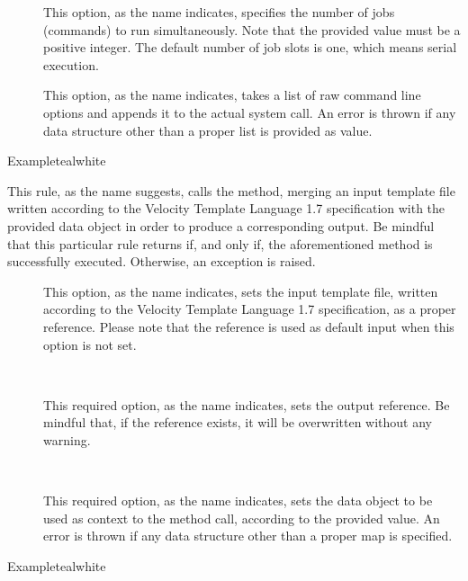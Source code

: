 \begin{description}
\begin{description}
\item[] This option, as the name indicates, specifies the number of jobs (commands) to run simultaneously. Note that the provided value must be a positive integer. The default number of job slots is one, which means serial execution.

\item[] This option, as the name indicates, takes a list of raw command line options and appends it to the actual system call. An error is thrown if any data structure other than a proper list is provided as value.
\end{description}

\begin{codebox}{Example}{teal}{\icnote}{white}
\end{codebox}

\item[\rulebox{velocity}{Paulo Cereda}] This rule, as the name suggests, calls the  method, merging an input template file written according to the Velocity Template Language 1.7 specification with the provided  data object in order to produce a corresponding  output. Be mindful that this particular rule returns  if, and only if, the aforementioned method is successfully executed. Otherwise, an exception is raised.

\begin{description}
\item[] This option, as the name indicates, sets the input template file, written according to the Velocity Template Language 1.7 specification, as a proper  reference. Please note that the  reference is used as default input when this option is not set.

\item[~\rqbox] This required option, as the name indicates, sets the output  reference. Be mindful that, if the reference exists, it will be overwritten without any warning.

\item[~\rqbox] This required option, as the name indicates, sets the  data object to be used as context to the method call, according to the provided value. An error is thrown if any data structure other than a proper map is specified.
\end{description}

\begin{codebox}{Example}{teal}{\icnote}{white}
\end{codebox}


\end{description}
